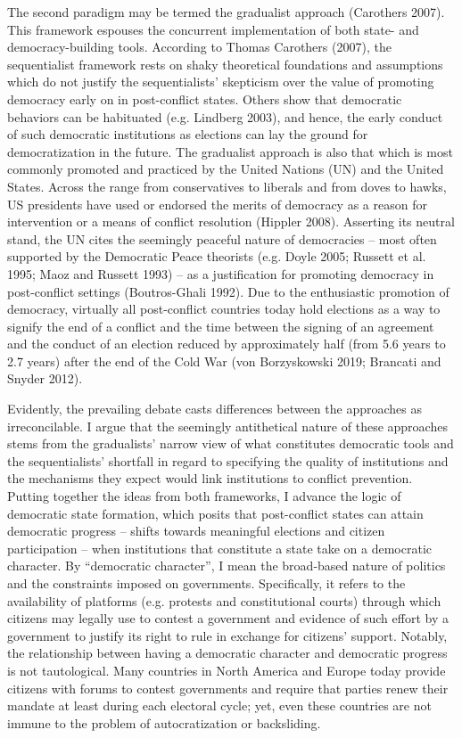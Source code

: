 \documentclass [11pt]{article}
\begin{document}
The second paradigm may be termed the gradualist approach (Carothers 2007). This framework espouses the concurrent implementation of both state- and democracy-building tools. According to Thomas Carothers (2007), the sequentialist framework rests on shaky theoretical foundations and assumptions which do not justify the sequentialists' skepticism over the value of promoting democracy early on in post-conflict states. Others show that democratic behaviors can be habituated (e.g. Lindberg 2003), and hence, the early conduct of such democratic institutions as elections can lay the ground for democratization in the future. The gradualist approach is also that which is most commonly promoted and practiced by the United Nations (UN) and the United States. Across the range from conservatives to liberals and from doves to hawks, US presidents have used or endorsed the merits of democracy as a reason for intervention or a means of conflict resolution (Hippler 2008). Asserting its neutral stand, the UN cites the seemingly peaceful nature of democracies -- most often supported by the Democratic Peace theorists (e.g. Doyle 2005; Russett et al. 1995; Maoz and Russett 1993) -- as a justification for promoting democracy in post-conflict settings (Boutros-Ghali 1992). Due to the enthusiastic promotion of democracy, virtually all post-conflict countries today hold elections as a way to signify the end of a conflict and the time between the signing of an agreement and the conduct of an election reduced by approximately half (from 5.6 years to 2.7 years) after the end of the Cold War (von Borzyskowski 2019; Brancati and Snyder 2012).

Evidently, the prevailing debate casts differences between the approaches as irreconcilable. I argue that the seemingly antithetical nature of these approaches stems from the gradualists' narrow view of what constitutes democratic tools and the sequentialists' shortfall in regard to specifying the quality of institutions and the mechanisms they expect would link institutions to conflict prevention. Putting together the ideas from both frameworks, I advance the logic of democratic state formation, which posits that post-conflict states can attain democratic progress -- shifts towards meaningful elections and citizen participation -- when institutions that constitute a state take on a democratic character. By ``democratic character'', I mean the broad-based nature of politics and the constraints imposed on governments. Specifically, it refers to the availability of platforms (e.g. protests and constitutional courts) through which citizens may legally use to contest a government and evidence of such effort by a government to justify its right to rule in exchange for citizens' support. Notably, the relationship between having a democratic character and democratic progress is not tautological. Many countries in North America and Europe today provide citizens with forums to contest governments and require that parties renew their mandate at least during each electoral cycle; yet, even these countries are not immune to the problem of autocratization or backsliding.
\end{document}
